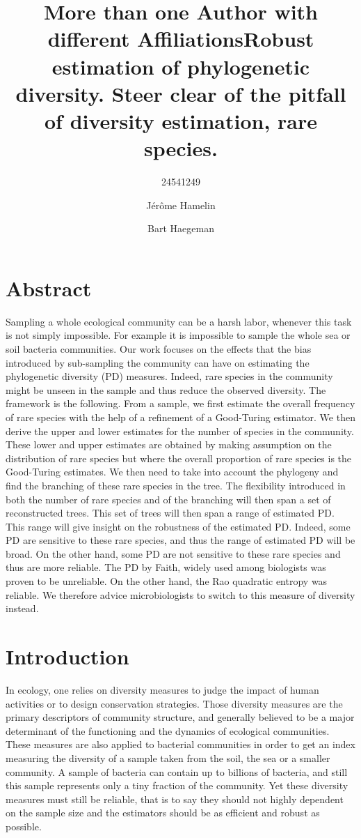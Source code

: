 \documentclass{article}
\title{More than one Author with different Affiliations}
\author[*]{24541249}
\author[**]{Jérôme Hamelin}
\author[**]{Bart Haegeman}
\affil[*]{École normale supérieure de Lyon, France}
\affil[**]{Laboratoire de Biotechnologie de l'Environnement (LBE), INRA Narbonne, France}
\title{Robust estimation of phylogenetic diversity. Steer clear of the pitfall of diversity estimation, rare species.}
\begin{document}
\maketitle 
\section*{Abstract}
\linenumbers

Sampling a whole ecological community can be a harsh labor, whenever this task is not
simply impossible. For example it is impossible to sample the whole sea or soil bacteria
communities. Our work focuses on the effects that the bias introduced by sub-sampling the
community can have on estimating the phylogenetic diversity (PD) measures. Indeed, rare species
in the community might be unseen in the sample and thus reduce the observed diversity. The
framework is the following. From a sample, we first estimate the overall frequency of rare species
with the help of a refinement of a Good-Turing estimator. We then derive the upper and lower
estimates for the number of species in the community. These lower and upper estimates are obtained
by making assumption on the distribution of rare species but where the overall proportion of rare species is
the Good-Turing estimates. We then need to take into account the phylogeny and find the branching
of these rare species in the tree. The flexibility introduced in both the number of rare species and of
the branching will then span a set of reconstructed trees. This set of trees will then span a range of
estimated PD. This range will give insight on the robustness of the estimated PD. Indeed, some PD
are sensitive to these rare species, and thus the range of estimated PD will be broad. On the other
hand, some PD are not sensitive to these rare species and thus are more reliable. The PD by Faith,
widely used among biologists was proven to be unreliable. On the other hand, the Rao quadratic entropy was reliable. 
We therefore advice microbiologists to switch to this measure of diversity
instead.
   
\newpage

\section*{Introduction}
In ecology, one relies on diversity measures to
judge the impact of human activities or to design conservation strategies. Those diversity measures are the primary descriptors of community structure, and generally believed to be a major determinant of the functioning and the dynamics of ecological communities. These measures are also applied to bacterial communities in order to get an index measuring the diversity of a sample taken from the soil, the sea or a smaller community. A sample of bacteria can contain up to billions of bacteria, and still this sample represents only a tiny fraction of the community. Yet these diversity measures must still be reliable, that is to say they should not highly dependent on the sample size and the estimators should be as efficient and robust as possible.
\end{document}
